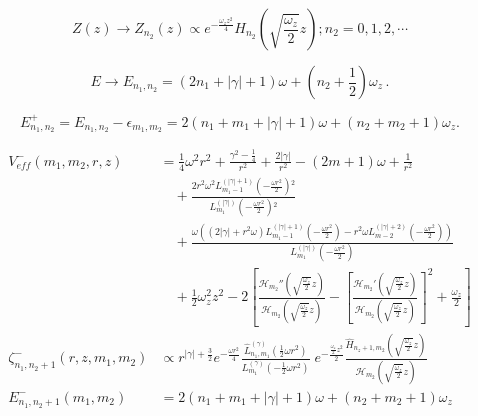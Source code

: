 \documentclass[12pt]{article}
\begin{document}
\begin{equation}
Z(z)\rightarrow Z_{n_2}(z)\propto e^{-\frac{\omega_z z^2}{4}}H_{n_2}\left(\sqrt{\frac{\omega_z}{2}} z\right); n_2=0,1,2,\cdots
\end{equation}

\begin{equation}
  E\rightarrow E_{n_1,n_2}=(2n_1+|\gamma|+1)\omega+\left(n_2+\frac{1}{2}\right)
\omega_z\,.
\end{equation}

\begin{equation}\label{CYL:E+}
 E^+_{n_1,n_2}=E_{n_1,n_2}-\epsilon_{m_1,m_2}=2(n_1+m_1+|\gamma|+1)\omega
+(n_2+m_2+1)\omega_z.
\end{equation}

\begin{align}
    V_{eff}^-(m_1, m_2, r, z) &= \frac{1}{4}\omega^2 r^2 + \frac{\gamma^2 - \frac{1}{4}}{r^2} + \frac{2 | \gamma | }{r^2}-(2 m+1) \omega +\frac{1}{r^2} \nonumber\\
    &\quad + \frac{2 r^2 \omega ^2 L_{m_1-1}^{(| \gamma | +1)}\left(-\frac{\omega r^2}{2}\right){}^2}{L_{m_1}^{(| \gamma |) }\left(-\frac{\omega r^2}{2}\right){}^2} \nonumber\\
    &\quad + \frac{\omega  \left(\left(2 | \gamma | +r^2 \omega \right) L_{m_1-1}^{(| \gamma | +1)}\left(-\frac{\omega r^2}{2}\right)-r^2 \omega  L_{m-2}^{(| \gamma | +2)}\left(-\frac{\omega r^2}{2}\right)\right)}{L_{m_1}^{(| \gamma | )}\left(-\frac{\omega r^2}{2}\right)}\nonumber\\
    &\quad + \frac{1}{2}\omega_z^2 z^2 - 2\left[\frac{\mathcal{H}_{m_2}''\left(\sqrt{\frac{\omega_z}{2}} z\right)}{\mathcal{H}_{m_2}\left(\sqrt{\frac{\omega_z}{2}} z\right)}-\left[\frac{\mathcal{H}_{m_2}'\left(\sqrt{\frac{\omega_z}{2}} z\right)}{\mathcal{H}_{m_2}\left(\sqrt{\frac{\omega_z}{2}} z\right)}\right]^2+\frac{\omega_z}{2}\right] \nonumber\\
    \zeta_{n_1, n_2+1}^-(r, z, m_1, m_2) &\propto r^{|\gamma| + \frac{3}{2}} e^{-\frac{\omega r^2}{4}} \frac{\hat{L}_{n_1, m_1}^{(\gamma)}\left(\frac{1}{2}\omega r^2 \right)}{L_{m_1}^{(\gamma)}\left(-\frac{1}{2}\omega r^2 \right)}\; e^{-\frac{\frac{\omega_z}{2} z^2}{2}} \frac{\hat{H}_{n_z+1, m_2}\left(\sqrt{\frac{\omega_z}{2}} z \right)}{\mathcal{H}_{m_2}\left(\sqrt{\frac{\omega_z}{2}} z \right)} \nonumber\\
    E^-_{n_1, n_2+1}(m_1, m_2) &= 2(n_1 + m_1 + |\gamma| + 1)\omega + \left(n_2 + m_2 + 1\right)\omega_z
\end{align}
\end{document}
